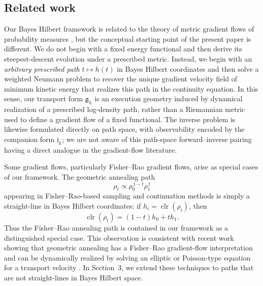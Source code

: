 \documentclass{article}
\theoremstyle{definition}
\DeclareMathOperator{\clr}{clr}
\begin{document}
\subsection{Related work}

Our Bayes Hilbert framework is related to the theory of metric gradient flows of probability measures \citep{ambrosioGradientFlowsMetric2008, santambrogio_euclidean_2017, chenHuangHuangReichStuart2023}, but the conceptual starting point of the present paper is different. We do not begin with a fixed
energy functional and then derive its steepest-descent evolution under a prescribed metric.
Instead, we begin with an \emph{arbitrary prescribed path} $t \mapsto h(t)$ in Bayes Hilbert
coordinates and then solve a weighted Neumann problem to recover the unique gradient velocity
field of minimum kinetic energy that realizes this path in the continuity equation. In this sense,
our transport form $\mathfrak g_h$ is an execution geometry induced by dynamical realization of a prescribed
log-density path, rather than a Riemannian metric used to define a gradient flow of a fixed
functional. The inverse problem is likewise formulated directly on path space, with observability
encoded by the companion form $\mathfrak j_h$; we are not aware of this path-space forward--inverse pairing having a direct analogue in the gradient-flow literature.

Some gradient flows, particularly Fisher--Rao gradient flows, arise as special cases of our framework. The geometric annealing path
\[
    \rho_t \propto \rho_0^{\,1-t}\rho_1^{\,t}
\]
appearing in Fisher--Rao-based sampling and continuation methods is simply a straight-line in
Bayes Hilbert coordinates: if $h_i=\clr(\rho_i)$, then
\[
    \clr(\rho_t) = (1-t)h_0 + t h_1.
\]
Thus the Fisher--Rao annealing path is contained in our framework as a distinguished special case.
This observation is consistent with recent work showing that geometric annealing has a
Fisher--Rao gradient-flow interpretation and can be dynamically realized by solving an elliptic or
Poisson-type equation for a transport velocity
\citep{maurais2024SamplingInUnitTime,domingoEnrichPooladian2023, taghvaei2023surveyfeedbackparticlefilter, Reich2011ADS}. In Section~3, we extend these techniques to paths that are not straight-lines in Bayes Hilbert space.
\end{document}
